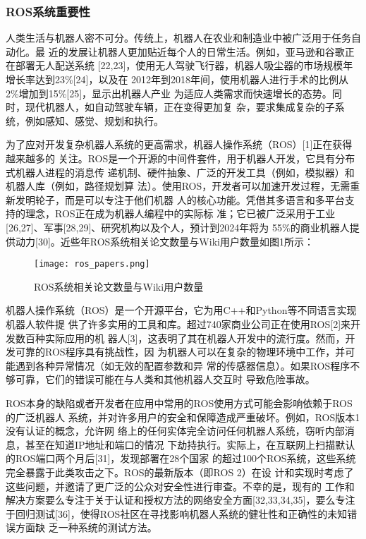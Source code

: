 \subsubsection{ROS系统重要性}
人类生活与机器人密不可分。传统上，机器人在农业和制造业中被广泛用于任务自动化。最
近的发展让机器人更加贴近每个人的日常生活。例如，亚马逊和谷歌正在部署无人配送系统
[22,23]，使用无人驾驶飞行器，机器人吸尘器的市场规模年增长率达到23\%[24]，以及在
2012年到2018年间，使用机器人进行手术的比例从2\%增加到15\%[25]，显示出机器人产业
为适应人类需求而快速增长的态势。同时，现代机器人，如自动驾驶车辆，正在变得更加复
杂，要求集成复杂的子系统，例如感知、感觉、规划和执行。

为了应对开发复杂机器人系统的更高需求，机器人操作系统（ROS）[1]正在获得越来越多的
关注。ROS是一个开源的中间件套件，用于机器人开发，它具有分布式机器人进程的消息传
递机制、硬件抽象、广泛的开发工具（例如，模拟器）和机器人库（例如，路径规划算
法）。使用ROS，开发者可以加速开发过程，无需重新发明轮子，而是可以专注于他们机器
人的核心功能。凭借其多语言和多平台支持的理念，ROS正在成为机器人编程中的实际标
准；它已被广泛采用于工业[26,27]、军事[28,29]、研究机构以及个人，预计到2024年将为
55\%的商业机器人提供动力[30]。近些年ROS系统相关论文数量与Wiki用户数量如图1所示：

\begin{figure}[H]
  \centering
  \texttt{[image: ros\_papers.png]}
  \caption{ROS系统相关论文数量与Wiki用户数量}
\end{figure}

机器人操作系统（ROS）是一个开源平台，它为用C++和Python等不同语言实现机器人软件提
供了许多实用的工具和库。超过740家商业公司正在使用ROS[2]来开发数百种实际应用的机
器人[3]，这表明了其在机器人开发中的流行度。然而，开发可靠的ROS程序具有挑战性，因
为机器人可以在复杂的物理环境中工作，并可能遇到各种异常情况（如无效的配置参数和异
常的传感器信息）。如果ROS程序不够可靠，它们的错误可能在与人类和其他机器人交互时
导致危险事故。

ROS本身的缺陷或者开发者在应用中常用的ROS使用方式可能会影响依赖于ROS的广泛机器人
系统，并对许多用户的安全和保障造成严重破坏。例如，ROS版本1没有认证的概念，允许网
络上的任何实体完全访问任何机器人系统，窃听内部消息，甚至在知道IP地址和端口的情况
下劫持执行。实际上，在互联网上扫描默认的ROS端口两个月后[31]，发现部署在28个国家
的超过100个ROS系统，这些系统完全暴露于此类攻击之下。ROS的最新版本（即ROS 2）在设
计和实现时考虑了这些问题，并邀请了更广泛的公众对安全性进行审查。不幸的是，现有的
工作和解决方案要么专注于关于认证和授权方法的网络安全方面[32,33,34,35]，要么专注
于回归测试[36]，使得ROS社区在寻找影响机器人系统的健壮性和正确性的未知错误方面缺
乏一种系统的测试方法。
